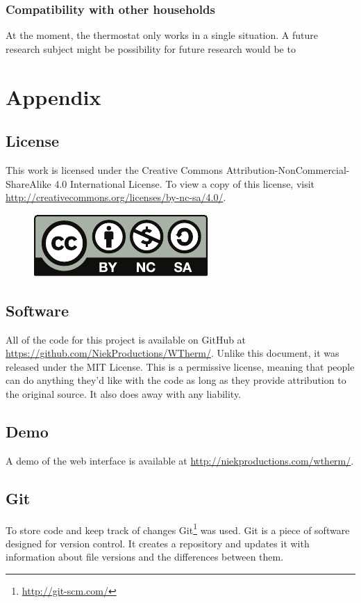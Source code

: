 \documentclass[12pt,a4paper,final]{report}
\begin{document}
\section{Compatibility with other households}
At the moment, the thermostat only works in a single situation. A future research subject might be possibility for future research would be to 

\newpage
\printbibliography
\vfill

\part*{Appendix}
{}
\chapter{License} \label{chap:License}
This work is licensed under the Creative Commons Attribution-NonCommercial-ShareAlike 4.0 International License. To view a copy of this license, visit \url{http://creativecommons.org/licenses/by-nc-sa/4.0/}.
\begin{figure}[H]
  \begin{center}
      \includegraphics{by-nc-sa}
  \end{center}
\end{figure}

\chapter{Software} \label{chap:Software}
All of the code for this project is available on GitHub at \url{https://github.com/NiekProductions/WTherm/}. Unlike this document, it was released under the MIT License. This is a permissive license, meaning that people can do anything they'd like with the code as long as they provide attribution to the original source. It also does away with any liability.

\chapter{Demo}
A demo of the web interface is available at \url{http://niekproductions.com/wtherm/}.

\chapter{Git}
To store code and keep track of changes Git\footnote{\url{http://git-scm.com/}} was used. Git is a piece of software designed for version control. It creates a repository and updates it with information about file versions and the differences between them.
\end{document}
